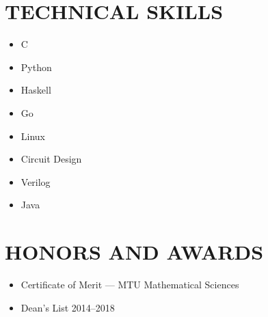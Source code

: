 \documentclass[letterpaper]{res}
\begin{document}
\begin{resume}
  \section{TECHNICAL SKILLS}
  \vspace{-1pt}
  \begin{multicols}{3}
    \begin{itemize} \itemsep1pt \parskip0pt 
      \item C
      \item Python
      \item Haskell
      \item Go
      \item Linux
      \item Circuit Design
      \item Verilog
      \item Java
    \end{itemize}
  \end{multicols}

  \section{HONORS AND AWARDS}
  \begin{itemize}
    \item Certificate of Merit --- MTU Mathematical Sciences
    \item Dean's List 2014--2018
  \end{itemize}

\end{resume}
\end{document}
